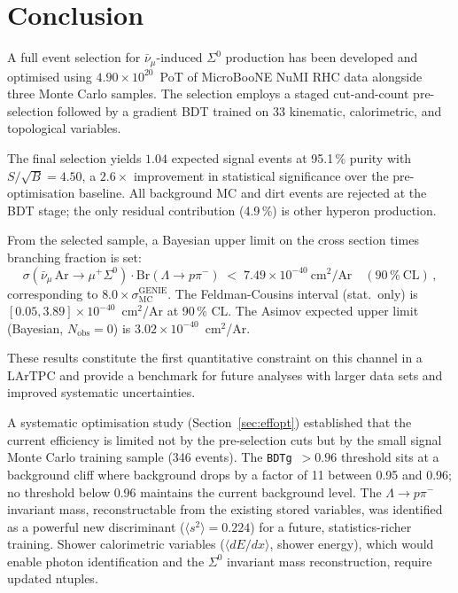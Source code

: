 \documentclass[12pt,a4paper]{article}
\begin{document}
\section{Conclusion}

A full event selection for $\bar\nu_\mu$-induced $\Sigma^0$ production
has been developed and optimised using $4.90\times10^{20}$~PoT of
MicroBooNE NuMI RHC data alongside three Monte Carlo samples.  The
selection employs a staged cut-and-count pre-selection followed by a
gradient BDT trained on 33 kinematic, calorimetric, and topological
variables.

The final selection yields $1.04$ expected signal events at 95.1\,\%
purity with $S/\sqrt{B} = 4.50$, a $2.6\times$ improvement in
statistical significance over the pre-optimisation baseline.  All
background MC and dirt events are rejected at the BDT stage; the only
residual contribution (4.9\,\%) is other hyperon production.

From the selected sample, a Bayesian upper limit on the cross section
times branching fraction is set:
\begin{equation*}
  \sigma(\bar\nu_\mu\,\text{Ar}\to\mu^+\Sigma^0)\cdot\text{Br}(\Lambda\to p\pi^-)
  \;<\; 7.49\times10^{-40}~\text{cm}^2/\text{Ar}
  \quad (90\,\%~\text{CL})\,,
\end{equation*}
corresponding to $8.0\times\sigma_\text{MC}^\text{GENIE}$.
The Feldman-Cousins interval (stat.\ only) is
$[0.05, 3.89]\times10^{-40}$~cm$^2$/Ar at 90\,\% CL.
The Asimov expected upper limit (Bayesian, $N_\text{obs}=0$) is
$3.02\times10^{-40}$~cm$^2$/Ar.

These results constitute the first quantitative constraint on this
channel in a LArTPC and provide a benchmark for future analyses
with larger data sets and improved systematic uncertainties.

A systematic optimisation study (Section~\ref{sec:effopt}) established
that the current efficiency is limited not by the pre-selection cuts
but by the small signal Monte Carlo training sample (346 events).
The \texttt{BDTg}~$>0.96$ threshold sits at a background cliff where
background drops by a factor of 11 between 0.95 and 0.96; no threshold
below 0.96 maintains the current background level.  The $\Lambda\to
p\pi^-$ invariant mass, reconstructable from the existing stored
variables, was identified as a powerful new discriminant
($\langle s^2\rangle = 0.224$) for a future, statistics-richer training.
Shower calorimetric variables ($\langle dE/dx\rangle$, shower energy),
which would enable photon identification and the $\Sigma^0$ invariant
mass reconstruction, require updated ntuples.
\end{document}
